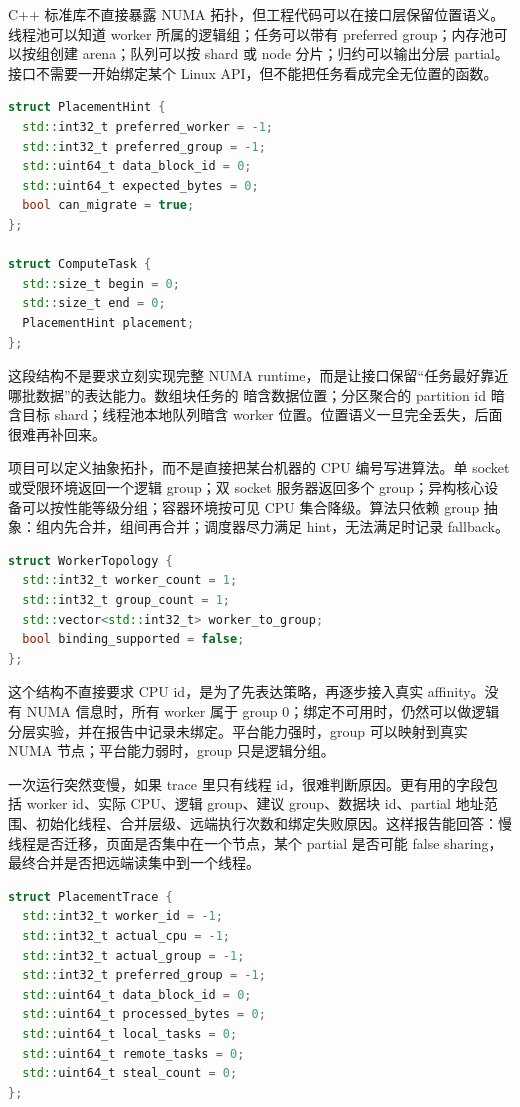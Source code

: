 C++ 标准库不直接暴露 NUMA 拓扑，但工程代码可以在接口层保留位置语义。线程池可以知道 worker 所属的逻辑组；任务可以带有 preferred group；内存池可以按组创建 arena；队列可以按 shard 或 node 分片；归约可以输出分层 partial。接口不需要一开始绑定某个 Linux API，但不能把任务看成完全无位置的函数。

\begin{lstlisting}[language=C++,caption={任务元数据中保留位置偏好}]
struct PlacementHint {
  std::int32_t preferred_worker = -1;
  std::int32_t preferred_group = -1;
  std::uint64_t data_block_id = 0;
  std::uint64_t expected_bytes = 0;
  bool can_migrate = true;
};

struct ComputeTask {
  std::size_t begin = 0;
  std::size_t end = 0;
  PlacementHint placement;
};
\end{lstlisting}

这段结构不是要求立刻实现完整 NUMA runtime，而是让接口保留“任务最好靠近哪批数据”的表达能力。数组块任务的  暗含数据位置；分区聚合的 partition id 暗含目标 shard；线程池本地队列暗含 worker 位置。位置语义一旦完全丢失，后面很难再补回来。

项目可以定义抽象拓扑，而不是直接把某台机器的 CPU 编号写进算法。单 socket 或受限环境返回一个逻辑 group；双 socket 服务器返回多个 group；异构核心设备可以按性能等级分组；容器环境按可见 CPU 集合降级。算法只依赖 group 抽象：组内先合并，组间再合并；调度器尽力满足 hint，无法满足时记录 fallback。

\begin{lstlisting}[language=C++,caption={拓扑描述的最小形态}]
struct WorkerTopology {
  std::int32_t worker_count = 1;
  std::int32_t group_count = 1;
  std::vector<std::int32_t> worker_to_group;
  bool binding_supported = false;
};
\end{lstlisting}

这个结构不直接要求 CPU id，是为了先表达策略，再逐步接入真实 affinity。没有 NUMA 信息时，所有 worker 属于 group 0；绑定不可用时，仍然可以做逻辑分层实验，并在报告中记录未绑定。平台能力强时，group 可以映射到真实 NUMA 节点；平台能力弱时，group 只是逻辑分组。

一次运行突然变慢，如果 trace 里只有线程 id，很难判断原因。更有用的字段包括 worker id、实际 CPU、逻辑 group、建议 group、数据块 id、partial 地址范围、初始化线程、合并层级、远端执行次数和绑定失败原因。这样报告能回答：慢线程是否迁移，页面是否集中在一个节点，某个 partial 是否可能 false sharing，最终合并是否把远端读集中到一个线程。

\begin{lstlisting}[language=C++,caption={拓扑运行摘要的示例形态}]
struct PlacementTrace {
  std::int32_t worker_id = -1;
  std::int32_t actual_cpu = -1;
  std::int32_t actual_group = -1;
  std::int32_t preferred_group = -1;
  std::uint64_t data_block_id = 0;
  std::uint64_t processed_bytes = 0;
  std::uint64_t local_tasks = 0;
  std::uint64_t remote_tasks = 0;
  std::uint64_t steal_count = 0;
};
\end{lstlisting}

